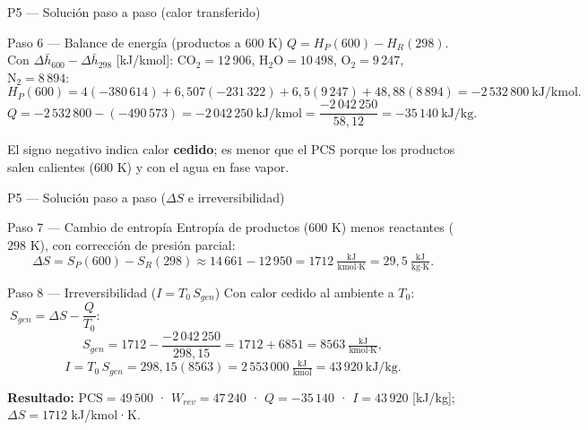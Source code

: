 \documentclass[aspectratio=169,10pt]{beamer}
\begin{document}
\begin{frame}{P5 --- Solución paso a paso (calor transferido)}
\begin{cardidea}{Paso 6 --- Balance de energía (productos a $600$ K)}{\faListOl}
{\footnotesize
$Q=H_P(600)-H_R(298)$. Con $\Delta\bar h_{600}-\Delta\bar h_{298}$ [kJ/kmol]: $\mathrm{CO_2}=12\,906$, $\mathrm{H_2O}=10\,498$, $\mathrm{O_2}=9\,247$, $\mathrm{N_2}=8\,894$:
$$H_P(600)=4(-380\,614)+6{,}507(-231\,322)+6{,}5(9\,247)+48{,}88(8\,894)=-2\,532\,800\ \text{kJ/kmol}.$$
$$Q=-2\,532\,800-(-490\,573)=-2\,042\,250\ \text{kJ/kmol}=\frac{-2\,042\,250}{58{,}12}=-35\,140\ \text{kJ/kg}.$$}
\end{cardidea}
\vspace{1mm}
\begin{cardnota}[\faInfoCircle]
El signo negativo indica calor \textbf{cedido}; es menor que el PCS porque los productos salen calientes ($600$ K) y con el agua en fase vapor.
\end{cardnota}
\end{frame}

\begin{frame}{P5 --- Solución paso a paso ($\Delta S$ e irreversibilidad)}
\begin{cardidea}{Paso 7 --- Cambio de entropía}{\faSuperscript}
Entropía de productos ($600$ K) menos reactantes ($298$ K), con corrección de presión parcial:
$$\Delta S=S_P(600)-S_R(298)\approx14\,661-12\,950=1712\ \tfrac{\text{kJ}}{\text{kmol·K}}=29{,}5\ \tfrac{\text{kJ}}{\text{kg·K}}.$$
\end{cardidea}
\vspace{1mm}
\begin{cardgear}{Paso 8 --- Irreversibilidad ($I=T_0\,S_{gen}$)}{\faListOl}
{\footnotesize
Con calor cedido al ambiente a $T_0$: $\ S_{gen}=\Delta S-\dfrac{Q}{T_0}$:
$$S_{gen}=1712-\frac{-2\,042\,250}{298{,}15}=1712+6851=8563\ \tfrac{\text{kJ}}{\text{kmol·K}},$$
$$I=T_0\,S_{gen}=298{,}15(8563)=2\,553\,000\ \tfrac{\text{kJ}}{\text{kmol}}=43\,920\ \text{kJ/kg}.$$}
\end{cardgear}
\vspace{0.8mm}
\begin{cardnota}[\faListOl]
\textbf{Resultado:} $\mathrm{PCS}=49\,500$ · $W_{rev}=47\,240$ · $Q=-35\,140$ · $I=43\,920$ [kJ/kg]; $\Delta S=1712$ kJ/kmol·K.
\end{cardnota}
\end{frame}
\end{document}

